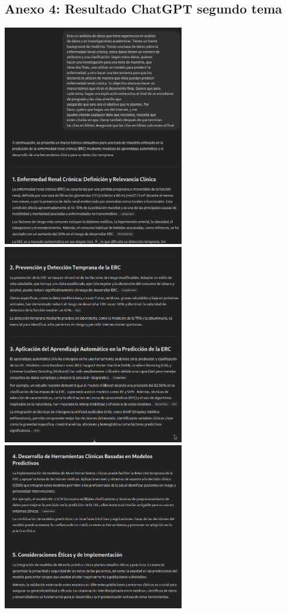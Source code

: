 \documentclass{article}
\begin{document}
\subsection{Anexo 4: Resultado ChatGPT segundo tema}
\begin{center}
    \includegraphics[width=0.6\textwidth]{../copilot_marc1.png}\\
    \includegraphics[width=0.6\textwidth]{../copilot_marc2.png}\\
    \includegraphics[width=0.6\textwidth]{../copilot_3.png}\\
\end{center}
\end{document}
